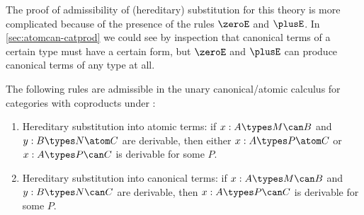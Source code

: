 The proof of admissibility of (hereditary) substitution for this theory is more complicated because of the presence of the rules $\zeroE$ and $\plusE$.
In \cref{sec:atomcan-catprod} we could see by inspection that canonical terms of a certain type must have a certain form, but $\zeroE$ and $\plusE$ can produce canonical terms of any type at all.

\begin{thm}\label{thm:atomcan-catcoprod-subadm}
  The following rules are admissible in the unary canonical/atomic calculus for categories with coproducts under \cG:
  \begin{enumerate}
  \item Hereditary substitution into atomic terms: if $x:A\types M\can B$ and $y:B\types N\atom C$ are derivable, then either $x:A\types P\atom C$ or $x:A\types P\can C$ is derivable for some $P$.\label{item:catcoprod-atomcan-subadm-1}
  \item Hereditary substitution into canonical terms: if $x:A\types M\can B$ and $y:B\types N\can C$ are derivable, then $x:A\types P\can C$ is derivable for some $P$.\label{item:catcoprod-atomcan-subadm-2}
  \end{enumerate}
\end{thm}
